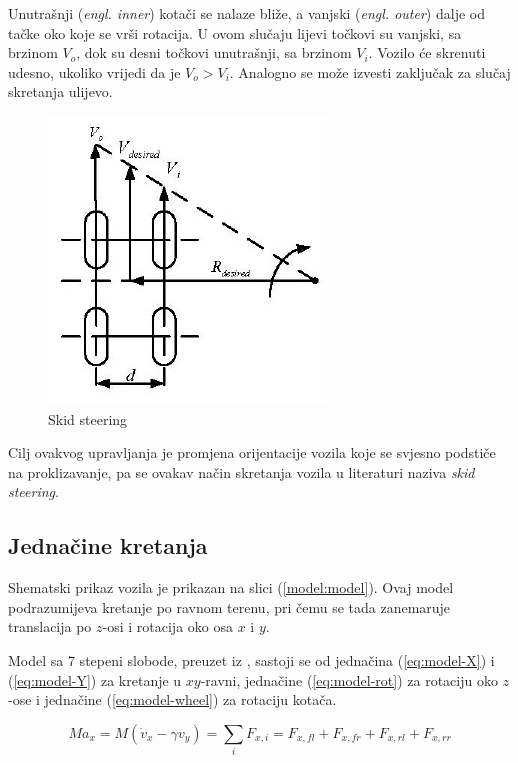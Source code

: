 Unutrašnji (\textit{engl. inner}) kotači se nalaze bliže, a vanjski (\textit{engl. outer}) dalje od tačke oko koje se vrši rotacija. U ovom slučaju lijevi točkovi su vanjski, sa brzinom $V_o$, dok su desni točkovi unutrašnji, sa brzinom $V_i$. Vozilo će skrenuti udesno, ukoliko vrijedi da je $V_o>V_i$. Analogno se može izvesti zaključak za slučaj skretanja ulijevo.

\begin{figure}
\centering
\includegraphics[scale=1]{slike/model/skid-steer.jpg}
\caption{Skid steering \citep{shuang2007skid}}
\label{model:skid-steer}
\end{figure}

Cilj ovakvog upravljanja je promjena orijentacije vozila koje se svjesno podstiče na proklizavanje, pa se ovakav način skretanja vozila u literaturi naziva \textit{skid steering}.

\subsection{Jednačine kretanja}

\qquad Shematski prikaz vozila je prikazan na slici (\ref{model:model}). Ovaj model podrazumijeva kretanje po ravnom terenu, pri čemu se tada zanemaruje translacija po $z$-osi i rotacija oko osa $x$ i $y$.

Model sa 7 stepeni slobode, preuzet iz \citep{aslam2014fuzzy}, sastoji se od jednačina (\ref{eq:model-X}) i (\ref{eq:model-Y}) za kretanje u $xy$-ravni, jednačine (\ref{eq:model-rot}) za rotaciju oko $z$-ose i jednačine (\ref{eq:model-wheel}) za rotaciju kotača.

\begin{equation}\label{eq:model-X}
M a_x = M ( \dot{v}_x - \gamma v_y ) = \sum_i F_{x,i} = F_{x,fl}+F_{x,fr}+F_{x,rl}+F_{x,rr}
\end{equation}


